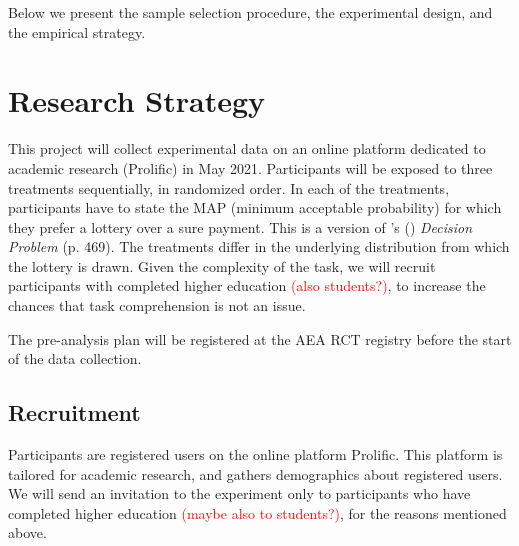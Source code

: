 

Below we present the sample selection procedure, the experimental design, and the empirical strategy.



\section{Research Strategy}
This project will collect experimental data on an online platform dedicated to academic research (Prolific) in May 2021. Participants will be exposed to three treatments sequentially, in randomized order.
In each of the treatments, participants have to state the MAP (minimum acceptable probability) for which they prefer a lottery over a sure payment.
This is a version of \citeauthor{Bohnet2004}'s (\citeyear{Bohnet2004}) \textit{Decision Problem} (p. 469).
The treatments differ in the underlying distribution from which the lottery is drawn.
Given the complexity of the task, we will recruit participants with completed higher education \textcolor{red}{(also students?)}, to increase the chances that task comprehension is not an issue.

The pre-analysis plan will be registered at the AEA RCT registry before the start of the data collection.

\subsection{Recruitment}
Participants are registered users on the online platform Prolific.
This platform is tailored for academic research, and gathers demographics about registered users.
We will send an invitation to the experiment only to participants who have completed higher education \textcolor{red}{(maybe also to students?)}, for the reasons mentioned above. 



